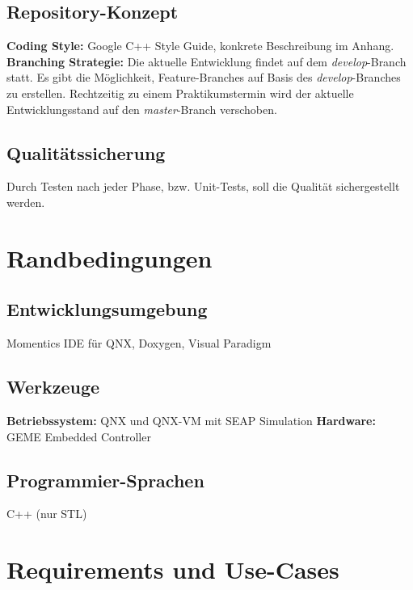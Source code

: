 \documentclass[oneside,a4paper,titlepage]{scrartcl}              %
\begin{document}
\newpage

\subsection{Repository-Konzept}
\textbf{Coding Style:} Google C++ Style Guide, konkrete Beschreibung im Anhang.\newline\newline
\textbf{Branching Strategie:} Die aktuelle Entwicklung findet auf dem \emph{develop}-Branch statt. Es gibt die Möglichkeit, Feature-Branches auf Basis des \emph{develop}-Branches zu erstellen. Rechtzeitig zu einem Praktikumstermin wird der aktuelle Entwicklungsstand auf den \emph{master}-Branch verschoben.

\subsection{Qualitätssicherung}
Durch Testen nach jeder Phase, bzw. Unit-Tests, soll die Qualität sichergestellt werden.


\section{Randbedingungen}

\subsection{Entwicklungsumgebung}
Momentics IDE für QNX, Doxygen, Visual Paradigm

\subsection{Werkzeuge}
\textbf{Betriebssystem:} QNX und QNX-VM mit SEAP Simulation\newline
\textbf{Hardware:} GEME Embedded Controller

\subsection{Programmier-Sprachen}
C++ (nur STL)


\section{Requirements und Use-Cases}
\end{document}
